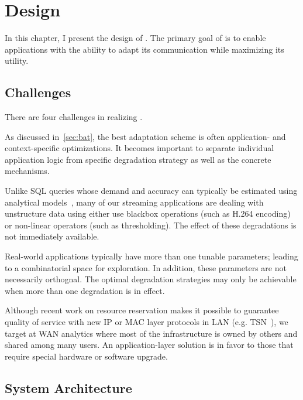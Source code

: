 \chapter{\sysname{} Design}
\label{sec:system-design}

In this chapter, I present the design of \sysname{}. The primary goal of
\sysname{} is to enable applications with the ability to adapt its communication
while maximizing its utility.

\section{Challenges}
\label{sec:challenges}

\noindent There are four challenges in realizing \sysname{}.

 As discussed in~\autoref{sec:bat}, the
best adaptation scheme is often application- and context-specific
optimizations. It becomes important to separate individual application logic
from specific degradation strategy as well as the concrete mechanisms.

 Unlike SQL queries whose demand and accuracy
can typically be estimated using analytical models~\cite{cormode2012synopses},
many of our streaming applications are dealing with unstructure data using
either use blackbox operations (such as H.264 encoding) or non-linear operators
(such as thresholding). The effect of these degradations is not immediately
available.

 Real-world applications typically have
more than one tunable parameters; leading to a combinatorial space for
exploration. In addition, these parameters are not necessarily orthognal.  The
optimal degradation strategies may only be achievable when more than one
degradation is in effect.

 Although recent work on
resource reservation makes it possible to guarantee quality of service with new
IP or MAC layer protocols in LAN (e.g. TSN~\cite{johas2013heterogeneous}), we
target at WAN analytics where most of the infrastructure is owned by others and
shared among many users. An application-layer solution is in favor to those that
require special hardware or software upgrade.

\section{System Architecture}
\label{sec:architecture}

